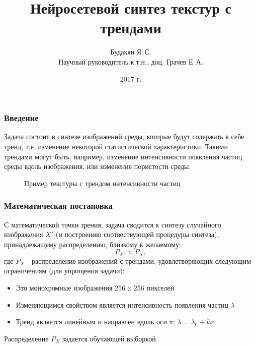 \documentclass[9pt]{beamer}
\begin{document}
\title{Нейросетевой синтез текстур с трендами}
\author{Будакян Я.\,С. \\ Научный руководитель к.т.н., доц. Грачев Е.\,А.}
\date{2017 г.} 

\maketitle

\begin{frame}\frametitle{Введение}
	Задача состоит в синтезе изображений среды, которые будут содержать в себе тренд, т.е. изменение некоторой статистической характеристики. Такими трендами могут быть, например, изменение интенсивности появления частиц среды вдоль изображения, или изменение пористости среды. \\
	\begin{figure}
		\caption{Пример текстуры с трендом интенсивности частиц}
	\end{figure}
\end{frame}

\begin{frame}\frametitle{Математическая постановка}
	С математической точки зрения, задача сводится к синтезу случайного изображения $X'$ (и построению соотвествующей процедуры синтеза), принадлежащему распределению, близкому к желаемому:
	$$ P_{X'} \approx P_X,$$
	где $P_X$ - распределение изображений с трендами, удовлетворяющих следующим ограничениям (для упрощения задачи):
	\begin{itemize}
		\item Это монохромные изображения 256 x 256 пикселей
		\item Изменяющимся свойством является интенсивность появления частиц $\lambda$
		\item Тренд является линейным и направлен вдоль оси x: 
		$ \lambda = \lambda_0 + kx $
	\end{itemize}
	Распределение $P_X$ задается обучающей выборкой.
\end{frame}
\end{document}
